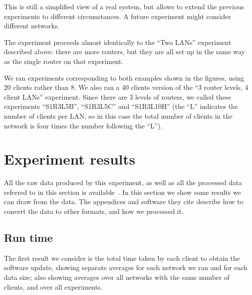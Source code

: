 \documentclass[a4paper,11pt,twocolumn]{article}
\begin{document}
This is still a simplified view of a real system, but allows to
extend the previous experiments to different circumstances.  A
future experiment might consider different networks.

The experiment proceeds almost identically to the ``Two LANs''
experiment described above: there are more routers, but they are
all set up in the same way as the single router on that experiment.

We ran experiments corresponding to both examples shown in the figures,
using 20 clients rather than 8.  We also ran a 40 clients version of the
``3 router levels, 4 client LANs'' experiment.  Since there are 3 levels
of routers, we called these experiments ``S1R3L5B'', ``S1R3L5C'' and
``S1R3L10H'' (the ``L'' indicates the number of clients per LAN, so
in this case the total number of clients in the network is four times
the number following the ``L'').

\section{Experiment results}
\label{results}

All the raw data produced by this experiment, as well as all the processed
data referred to in this section is available~\cite{data}.  In this section
we show some results we can draw from the data.  The appendices and software
they cite describe how to convert the data to other formats, and how we
processed it.

\subsection{Run time}
The first result we consider is the total time taken by each client
to obtain the software update, showing separate averages for each network
we ran and for each data size; also showing averages over all networks
with the same number of clients, and over all experiments.
\end{document}
